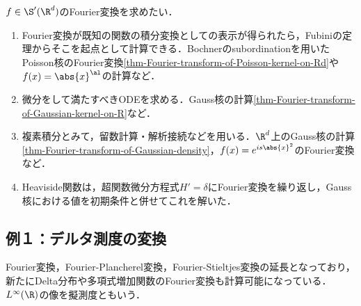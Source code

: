 \documentclass[uplatex,dvipdfmx]{jsreport}
\begin{document}
\begin{remarks}[計算テクニックをまとめてみる]
    $f\in\S'(\R^d)$のFourier変換を求めたい．
    \begin{enumerate}
        \item Fourier変換が既知の関数の積分変換としての表示が得られたら，Fubiniの定理からそこを起点として計算できる．Bochnerのsubordinationを用いたPoisson核のFourier変換\ref{thm-Fourier-transform-of-Poisson-kernel-on-Rd}や$f(x)=\abs{x}^\al$の計算など．
        \item 微分をして満たすべきODEを求める．Gauss核の計算\ref{thm-Fourier-transform-of-Gaussian-kernel-on-R}など．
        \item 複素積分とみて，留数計算・解析接続などを用いる．$\R^d$上のGauss核の計算\ref{thm-Fourier-transform-of-Gaussian-density}，$f(x)=e^{is\abs{x}^2}$のFourier変換など．
        \item Heaviside関数は，超関数微分方程式$H'=\delta$にFourier変換を繰り返し，Gauss核における値を初期条件と併せてこれを解いた．
    \end{enumerate}
\end{remarks}

\subsection{例１：デルタ測度の変換}

\begin{tcolorbox}[colframe=ForestGreen, colback=ForestGreen!10!white,breakable,colbacktitle=ForestGreen!40!white,coltitle=black,fonttitle=\bfseries\sffamily,
title=]
    Fourier変換，Fourier-Plancherel変換，Fourier-Stieltjes変換の延長となっており，新たにDelta分布や多項式増加関数のFourier変換も計算可能になっている．
    $L^\infty(\R)$の像を擬測度ともいう．
\end{tcolorbox}
\end{document}
